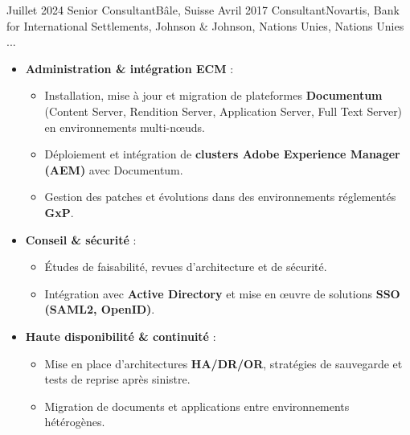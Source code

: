 %
%
%

\begin{experiences}

\consultantexperience
    {Juillet 2024} {Senior Consultant}{}{Bâle, Suisse}
    {Avril 2017}    {Consultant}{Novartis, Bank for International Settlements, Johnson \& Johnson, Nations Unies, Nations Unies ...} {
        \begin{itemize}[left=0pt,label={},itemsep=0.5em]

          \item \textbf{Administration \& intégration ECM} :
            \begin{itemize}[itemsep=0.2em,topsep=0.2em,parsep=0pt]
              \small
              \item Installation, mise à jour et migration de plateformes \textbf{Documentum} (Content Server, Rendition Server, Application Server, Full Text Server) en environnements multi-nœuds.
              \item Déploiement et intégration de \textbf{clusters Adobe Experience Manager (AEM)} avec Documentum.
              \item Gestion des patches et évolutions dans des environnements réglementés \textbf{GxP}.
            \end{itemize}

          \item \textbf{Conseil \& sécurité} :
            \begin{itemize}[itemsep=0.2em,topsep=0.2em,parsep=0pt]
              \small
              \item Études de faisabilité, revues d’architecture et de sécurité.
              \item Intégration avec \textbf{Active Directory} et mise en œuvre de solutions \textbf{SSO (SAML2, OpenID)}.
            \end{itemize}

          \item \textbf{Haute disponibilité \& continuité} :
            \begin{itemize}[itemsep=0.2em,topsep=0.2em,parsep=0pt]
              \small
              \item Mise en place d’architectures \textbf{HA/DR/OR}, stratégies de sauvegarde et tests de reprise après sinistre.
              \item Migration de documents et applications entre environnements hétérogènes.
            \end{itemize}


\end{itemize}}
\end{experiences}
